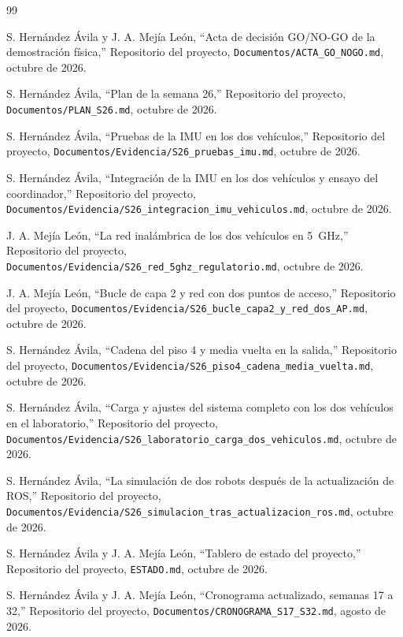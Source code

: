 \documentclass[12pt,letterpaper]{article}
\begin{document}
\begin{thebibliography}{99}

S. Hernández Ávila y J. A. Mejía León,
``Acta de decisión GO/NO-GO de la demostración física,''
Repositorio del proyecto, \texttt{Documentos/ACTA\_GO\_NOGO.md}, octubre de 2026.

S. Hernández Ávila,
``Plan de la semana 26,''
Repositorio del proyecto, \texttt{Documentos/PLAN\_S26.md}, octubre de 2026.

S. Hernández Ávila,
``Pruebas de la IMU en los dos vehículos,''
Repositorio del proyecto, \texttt{Documentos/Evidencia/S26\_pruebas\_imu.md}, octubre de 2026.

S. Hernández Ávila,
``Integración de la IMU en los dos vehículos y ensayo del coordinador,''
Repositorio del proyecto, \texttt{Documentos/Evidencia/S26\_integracion\_imu\_vehiculos.md}, octubre de 2026.

J. A. Mejía León,
``La red inalámbrica de los dos vehículos en 5~GHz,''
Repositorio del proyecto, \texttt{Documentos/Evidencia/S26\_red\_5ghz\_regulatorio.md}, octubre de 2026.

J. A. Mejía León,
``Bucle de capa 2 y red con dos puntos de acceso,''
Repositorio del proyecto, \texttt{Documentos/Evidencia/S26\_bucle\_capa2\_y\_red\_dos\_AP.md}, octubre de 2026.

S. Hernández Ávila,
``Cadena del piso 4 y media vuelta en la salida,''
Repositorio del proyecto, \texttt{Documentos/Evidencia/S26\_piso4\_cadena\_media\_vuelta.md}, octubre de 2026.

S. Hernández Ávila,
``Carga y ajustes del sistema completo con los dos vehículos en el laboratorio,''
Repositorio del proyecto, \texttt{Documentos/Evidencia/S26\_laboratorio\_carga\_dos\_vehiculos.md}, octubre de 2026.

S. Hernández Ávila,
``La simulación de dos robots después de la actualización de ROS,''
Repositorio del proyecto, \texttt{Documentos/Evidencia/S26\_simulacion\_tras\_actualizacion\_ros.md}, octubre de 2026.

S. Hernández Ávila y J. A. Mejía León,
``Tablero de estado del proyecto,''
Repositorio del proyecto, \texttt{ESTADO.md}, octubre de 2026.

S. Hernández Ávila y J. A. Mejía León,
``Cronograma actualizado, semanas 17 a 32,''
Repositorio del proyecto, \texttt{Documentos/CRONOGRAMA\_S17\_S32.md}, agosto de 2026.

\end{thebibliography}
\end{document}
